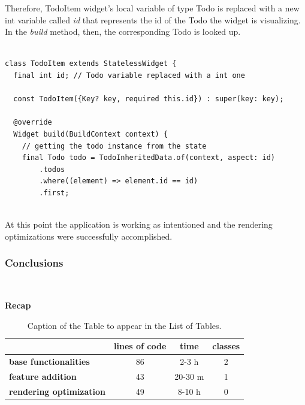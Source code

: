 Therefore, TodoItem widget's local variable of type Todo is replaced with a new int variable called \textit{id} that represents the id of the Todo the widget is visualizing. In the \textit{build} method, then, the corresponding Todo is looked up.
\mbox{}\\
\begin{code}
\mbox{}
\label{code:2.48}
\begin{verbatim}

class TodoItem extends StatelessWidget {
  final int id; // Todo variable replaced with a int one

  const TodoItem({Key? key, required this.id}) : super(key: key);

  @override
  Widget build(BuildContext context) {
  	// getting the todo instance from the state
    final Todo todo = TodoInheritedData.of(context, aspect: id)
        .todos
        .where((element) => element.id == id)
        .first;
\end{verbatim}
\end{code}
\mbox{}\\
At this point the application is working as intentioned and the rendering optimizations were successfully accomplished. \\


\subsubsection{Conclusions} \mbox{} \\
\label{subpar:render_optimizations_inherited_widget}
\begin{table}[H]
    \caption*{\textbf{Recap}}
    \centering 
    \begin{tabular}{| l | c |c| c |}
    \hline
    \rowcolor{bluepoli!40} %
    \hline
     & \textbf{lines of code} & \textbf{time} & \textbf{classes} \T\B \\
     \hline
    \textbf{base functionalities} & 86 & 2-3 h & 2 \T\B \\ 
    \textbf{feature addition} & 43 & 20-30 m & 1 \T\B\\ 
    \textbf{rendering optimization} & 49 & 8-10 h & 0 \B\\
    \hline
    \end{tabular}
    \\[10pt]
    \caption{Caption of the Table to appear in the List of Tables.}
    \label{table:example}
\end{table}

